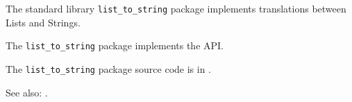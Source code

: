 
The standard library {\tt list\_to\_string} package implements translations between 
Lists and Strings.

The {\tt list\_to\_string} package implements the  API.

The {\tt list\_to\_string} package source code is in .

See also:  .


